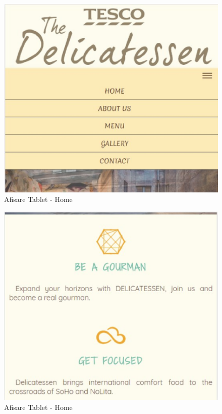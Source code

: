 \documentclass[11pt]{article}
\begin{document}
\begin{figure}[h]
\includegraphics{images/121.eps}
\caption{Afisare Tablet - Home}
\end{figure}

\begin{figure}[h]
\includegraphics{images/122.eps}
\caption{Afisare Tablet - Home}
\end{figure}
\end{document}
